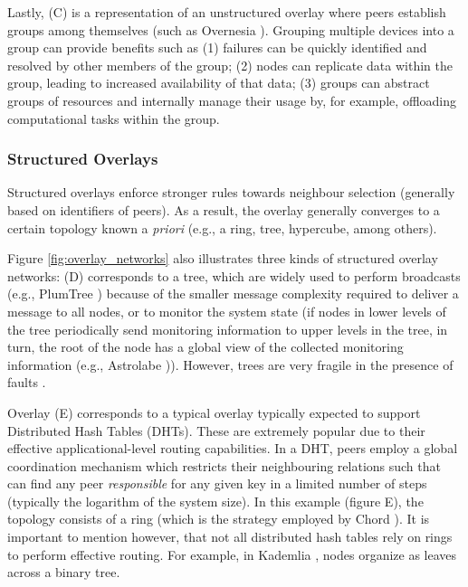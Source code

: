 Lastly, (C) is a representation of an unstructured overlay where peers establish groups among themselves (such as Overnesia \cite{leitao2014overnesia}). Grouping multiple devices into a group can provide benefits such as (1) failures can be quickly identified and resolved by other members of the group; (2) nodes can replicate data within the group, leading to increased availability of that data; (3) groups can abstract groups of resources and internally manage their usage by, for example, offloading computational tasks within the group. 

\subsubsection*{Structured Overlays}

Structured overlays enforce stronger rules towards neighbour selection (generally based on identifiers of peers). As a result, the overlay generally converges to a certain topology known a \textit{priori} (e.g., a ring, tree, hypercube, among others). 

Figure \ref{fig:overlay_networks} also illustrates three kinds of structured overlay networks: (D) corresponds to a tree, which are widely used to perform broadcasts (e.g., PlumTree \cite{leitao2007epidemic}) because of the smaller message complexity required to deliver a message to all nodes, or to monitor the system state (if nodes in lower levels of the tree periodically send monitoring information to upper levels in the tree, in turn, the root of the node has a global view of the collected monitoring information (e.g., Astrolabe \cite{Renesse2003})). However, trees are very fragile in the presence of faults \cite{leitao2007epidemic}.

Overlay (E) corresponds to a typical overlay typically expected to support Distributed Hash Tables (DHTs). These are extremely popular due to their effective applicational-level routing capabilities. In a DHT, peers employ a global coordination mechanism which restricts their neighbouring relations such that can find any peer \textit{responsible} for any given key in a  limited number of steps (typically the logarithm of the system size). In this example (figure E), the topology consists of a ring (which is the strategy employed by Chord \cite{stoica2003chord}). It is important to mention however, that not all distributed hash tables rely on rings to perform effective routing. For example, in Kademlia \cite{maymounkov2002kademlia}, nodes organize as leaves across a binary tree.

